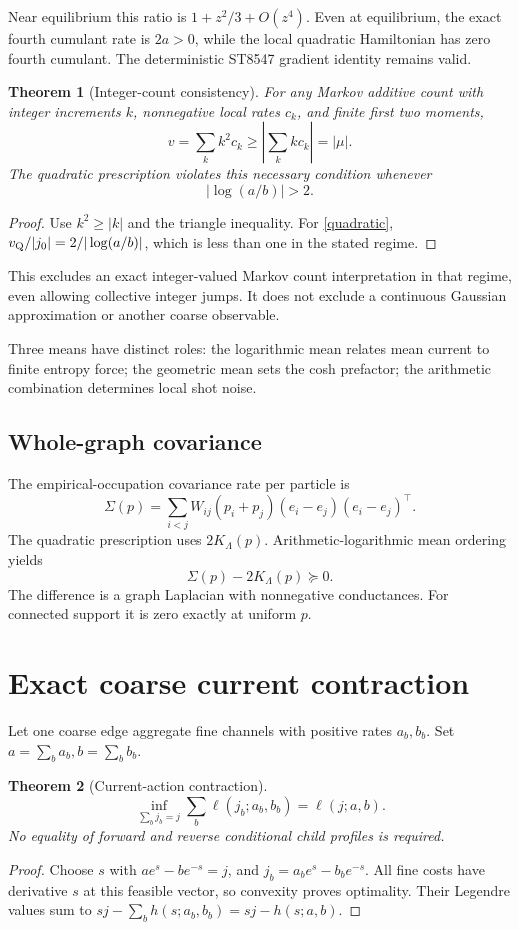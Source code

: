 \documentclass[11pt,a4paper]{article}
\newtheorem{theorem}{Theorem}
\begin{document}
Near equilibrium this ratio is \(1+z^2/3+O(z^4)\).
Even at equilibrium, the exact fourth cumulant rate is \(2a>0\), while
the local quadratic Hamiltonian has zero fourth cumulant.
The deterministic ST8547 gradient identity remains valid.

\begin{theorem}[Integer-count consistency]
For any Markov additive count with integer increments \(k\), nonnegative
local rates \(c_k\), and finite first two moments,
\[
v=\sum_k k^2c_k\ge\left|\sum_k kc_k\right|=|\mu|.
\]
The quadratic prescription violates this necessary condition whenever
\[
\boxed{|\log(a/b)|>2.}
\]
\end{theorem}
\begin{proof}
Use \(k^2\ge|k|\) and the triangle inequality.
For \eqref{quadratic},
\(v_{\rm Q}/|j_0|=2/|\log(a/b)|\), which is less than one in the stated
regime.
\end{proof}

This excludes an exact integer-valued Markov count interpretation in that
regime, even allowing collective integer jumps. It does not exclude a
continuous Gaussian approximation or another coarse observable.

Three means have distinct roles: the logarithmic mean relates mean current
to finite entropy force; the geometric mean sets the cosh prefactor; the
arithmetic combination determines local shot noise.

\subsection{Whole-graph covariance}

The empirical-occupation covariance rate per particle is
\[
\Sigma(p)=\sum_{i<j}W_{ij}(p_i+p_j)
(e_i-e_j)(e_i-e_j)^\top.
\]
The quadratic prescription uses \(2K_\Lambda(p)\).
Arithmetic-logarithmic mean ordering yields
\[
\boxed{\Sigma(p)-2K_\Lambda(p)\succeq0.}
\]
The difference is a graph Laplacian with nonnegative conductances.
For connected support it is zero exactly at uniform \(p\).

\section{Exact coarse current contraction}

Let one coarse edge aggregate fine channels with positive rates
\(a_b,b_b\). Set \(a=\sum_ba_b,b=\sum_bb_b\).

\begin{theorem}[Current-action contraction]
\[
\boxed{\inf_{\sum_bj_b=j}\sum_b\ell(j_b;a_b,b_b)=\ell(j;a,b).}
\]
No equality of forward and reverse conditional child profiles is required.
\end{theorem}
\begin{proof}
Choose \(s\) with \(ae^s-be^{-s}=j\), and
\(j_b=a_be^s-b_be^{-s}\). All fine costs have derivative \(s\) at this
feasible vector, so convexity proves optimality. Their Legendre values
sum to \(sj-\sum_bh(s;a_b,b_b)=sj-h(s;a,b)\).
\end{proof}
\end{document}
